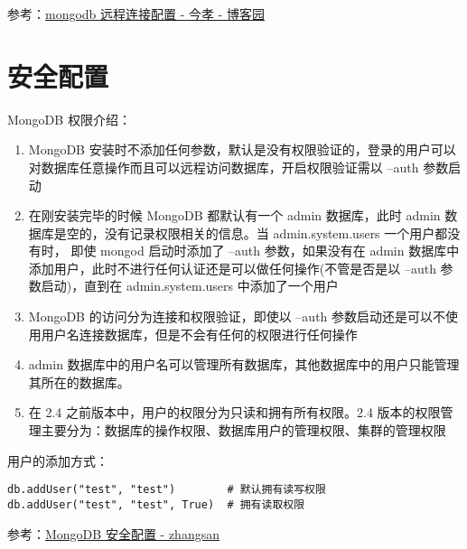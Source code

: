 \documentclass[11pt]{article}
\begin{document}
参考：\href{https://www.cnblogs.com/jinxiao-pu/p/7121307.html}{mongodb 远程连接配置 - 今孝 - 博客园}

\section{安全配置}
\label{sec:org3313718}
MongoDB 权限介绍：
\begin{enumerate}
\item MongoDB 安装时不添加任何参数，默认是没有权限验证的，登录的用户可以对数据库任意操作而且可以远程访问数据库，开启权限验证需以 --auth 参数启动
\item 在刚安装完毕的时候 MongoDB 都默认有一个 admin 数据库，此时 admin 数据库是空的，没有记录权限相关的信息。当 admin.system.users 一个用户都没有时，
即使 mongod 启动时添加了 --auth 参数，如果没有在 admin 数据库中添加用户，此时不进行任何认证还是可以做任何操作(不管是否是以 --auth 参数启动)，直到在 admin.system.users 中添加了一个用户
\item MongoDB 的访问分为连接和权限验证，即使以 --auth 参数启动还是可以不使用用户名连接数据库，但是不会有任何的权限进行任何操作
\item admin 数据库中的用户名可以管理所有数据库，其他数据库中的用户只能管理其所在的数据库。
\item 在 2.4 之前版本中，用户的权限分为只读和拥有所有权限。2.4 版本的权限管理主要分为：数据库的操作权限、数据库用户的管理权限、集群的管理权限
\end{enumerate}

用户的添加方式：
\begin{verbatim}
db.addUser("test", "test")        # 默认拥有读写权限
db.addUser("test", "test", True)  # 拥有读取权限
\end{verbatim}

参考：\href{https://wooyun.js.org/drops/MongoDB安全配置.html}{MongoDB 安全配置 - zhangsan}
\end{document}
